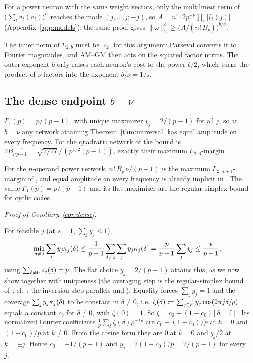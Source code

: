 For a power neuron with the same weight vectors, only the multilinear term of $\big(\sum_tu_t(a_t)\big)^n$ reaches the mode $(j,\dots,j;-j)$, so $A=n!\cdot2p^{-\nu}\prod_t|\hat v_t(j)|$ (Appendix~\ref{app:models}); the same proof gives $\|\omega\|_2^b\ge\big(A/(n!\,B_p)\big)^{b/\nu}$.

The inner norm of $L_{2,b}$ must be $\ell_2$ for this argument: Parseval converts it to Fourier magnitudes, and AM--GM then acts on the squared factor norms. The outer exponent $b$ only raises each neuron's cost to the power $b/2$, which turns the product of $\nu$ factors into the exponent $b/\nu=1/s$.

\subsection{The dense endpoint \texorpdfstring{$b=\nu$}{b = nu}}\label{app:dense}

\begin{corollary}[$b=\nu$: every frequency is used]\label{cor:dense}
$\Gamma_1(p)=p/(p-1)$, with unique maximizer $y_j=2/(p-1)$ for all $j$, so at $b=\nu$ any network attaining Theorem~\ref{thm:universal} has equal amplitude on every frequency. For the quadratic network of \citet{morwani2024feature} the bound is $2B_p\frac p{p-1}=\sqrt{2/27}\,/\,(p^{1/2}(p-1))$, exactly their maximum $L_{2,3}$-margin \citep[Thm.~7; width $m\ge4(p-1)$]{morwani2024feature}.
\end{corollary}
For the $n$-operand power network, $n!\,B_p\,p/(p-1)$ is the maximum $L_{2,n+1}$-margin of \citet[Thm.~4.1]{li2025nsum}, and equal amplitude on every frequency is already implicit in \citet[App.~F.3]{morwani2024feature}. The value $\Gamma_1(p)=p/(p-1)$ and its flat maximizer are the regular-simplex bound for cyclic codes \citep{rankin1955closest,slepian1968group}.

\emph{Proof of Corollary~\ref{cor:dense}.}

For feasible $y$ (at $s=1$, $\sum_jy_j\le1$),
\[
\min_{\delta\neq0}\sum_jy_j\kappa_{j}(\delta)\le\frac1{p-1}\sum_{\delta\neq0}\sum_jy_j\kappa_{j}(\delta)=\frac p{p-1}\sum_jy_j\le\frac p{p-1},
\]
using $\sum_{\delta\neq0}\kappa_{j}(\delta)=p$. The flat choice $y_j=2/(p-1)$ attains this, as we now show together with uniqueness (the averaging step is the regular-simplex bound of \citealp{rankin1955closest}; cf.\ \citealp[\S3.5--3.6]{fiedler1973algebraic}; the inversion step parallels \citealp[App.~F.3]{morwani2024feature} and \citealp[Lemma~F.2]{li2025nsum}). Equality forces $\sum_jy_j=1$ and the coverage $\sum_jy_j\kappa_{j}(\delta)$ to be constant in $\delta\neq0$, i.e.\ $\zeta(\delta):=\sum_{j\in F}y_j\cos(2\pi j\delta/p)$ equals a constant $c_0$ for $\delta\neq0$, with $\zeta(0)=1$. So $\zeta=c_0+(1-c_0)[\delta=0]$. Its normalized Fourier coefficients $\frac1p\sum_\delta\zeta(\delta)\rho^{-k\delta}$ are $c_0+(1-c_0)/p$ at $k=0$ and $(1-c_0)/p$ at $k\neq0$. From the cosine form they are $0$ at $k=0$ and $y_j/2$ at $k=\pm j$. Hence $c_0=-1/(p-1)$ and $y_j=2(1-c_0)/p=2/(p-1)$ for every $j$.

